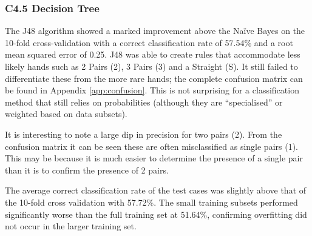 \documentclass[10pt, a4paper]{article}
\begin{document}
\subsubsection*{C4.5 Decision Tree}

The J48 algorithm showed a marked improvement above the Na\"ive Bayes on the 10-fold cross-validation with a correct classification rate of 57.54\% and a root mean squared error of 0.25. J48 was able to create rules that accommodate less likely hands such as 2 Pairs (2), 3 Pairs (3) and a Straight (S). It still failed to differentiate these from the more rare hands; the complete confusion matrix can be found in Appendix \ref{app:confusion}. This is not surprising for a classification method that still relies on probabilities (although they are ``specialised'' or weighted based on data subsets). 

It is interesting to note a large dip in precision for two pairs (2). From the confusion matrix it can be seen these are often misclassified as single pairs (1). This may be because it is much easier to determine the presence of a single pair than it is to confirm the presence of 2 pairs.

The average correct classification rate of the test cases was slightly above that of the 10-fold cross validation with 57.72\%. The small training subsets performed significantly worse than the full training set at 51.64\%, confirming overfitting did not occur in the larger training set.
\end{document}
